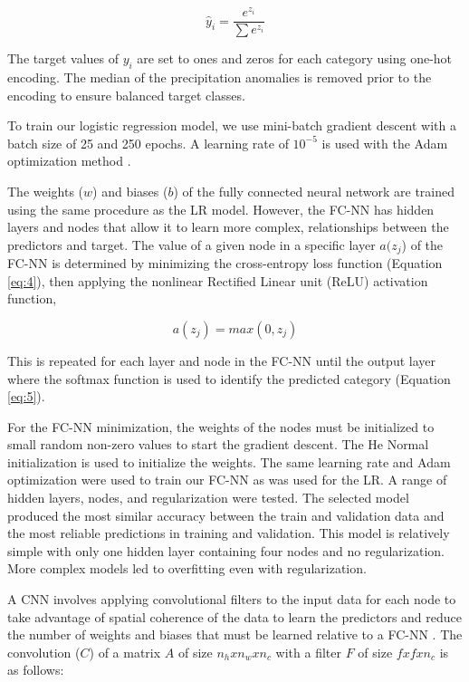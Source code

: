 \documentclass{ametsocV6.1}
\begin{document}
\begin{equation}
\label{eq:5}
\hat{y}_{i}=\frac{e^{z_i}}{\sum{e^{z_i}}}
\end{equation}

The target values of $y_i$ are set to ones and zeros for each category using one-hot encoding. The median of the precipitation anomalies is removed prior to the encoding to ensure balanced target classes. 

To train our logistic regression model, we use mini-batch gradient descent with a batch size of 25 and 250 epochs.  A learning rate of $10^{-5}$ is used with the Adam optimization method \citep{kingma_adam_2017}.

\appendix[B] 
\label{BFCNN}
The weights ($w$) and biases ($b$) of the fully connected neural network are trained using the same procedure as the LR model.  However, the FC-NN has hidden layers and nodes that allow it to learn more complex, relationships between the predictors and target.  The value of a given node in a specific layer $a(z_j$) of the FC-NN is determined by minimizing the cross-entropy loss function (Equation \ref{eq:4}), then applying the nonlinear Rectified Linear unit (ReLU) activation function, 

\begin{equation}
\label{eq:6}
a(z_j)=max(0,z_j)
\end{equation}

This is repeated for each layer and node in the FC-NN until the output layer where the softmax function is used to identify the predicted category (Equation \ref{eq:5}).  

For the FC-NN minimization, the weights of the nodes must be initialized to small random non-zero values to start the gradient descent.  The He Normal initialization \citep{he_deep_2016} is used to initialize the weights. The same learning rate and Adam optimization were used to train our FC-NN as was used for the LR.  A range of hidden layers, nodes, and regularization were tested.  The selected model produced the most similar accuracy between the train and validation data and the most reliable predictions in training and validation.  This model is relatively simple with only one hidden layer containing four nodes and no regularization.  More complex models led to overfitting even with regularization.
                      
\appendix[C] 
\label{CCNN}
A CNN involves applying convolutional filters to the input data for each node to take advantage of spatial coherence of the data to learn the predictors and reduce the number of weights and biases that must be learned relative to a FC-NN \citep{krizhevsky_imagenet_2017}. The convolution ($C$) of a matrix $A$ of size $n_h x n_w x n_c$ with a filter $F$ of size $fxfxn_c$ is as follows:
\end{document}
